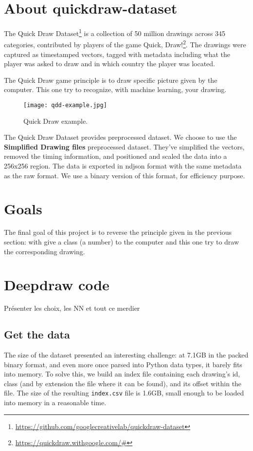 \documentclass[
  10pt, 
  a4paper,
  oneside, 
  headinclude, 
  footinclude, 
  BCOR5mm, 
]{scrartcl}
\begin{document}
\section{About quickdraw-dataset}

The Quick Draw Dataset\footnote{\url{https://github.com/googlecreativelab/quickdraw-dataset}} is a collection of 50 million drawings across 345 categories, contributed by players of the game Quick, Draw!\footnote{\url{https://quickdraw.withgoogle.com/\#}}. The drawings were captured as timestamped vectors, tagged with metadata including what the player was asked to draw and in which country the player was located.

The Quick Draw game principle is to draw specific picture given by the computer. This one try to recognize, with machine learning, your drawing.

\begin{figure}[h]
	\center
	\texttt{[image: qdd-example.jpg]}
	\caption{Quick Draw example.}
	\label{promo-asylamba}
\end{figure}

The Quick Draw Dataset provides preprocessed dataset. We choose to use the \textbf{Simplified Drawing files} preprocessed dataset. They've simplified the vectors, removed the timing information, and positioned and scaled the data into a 256x256 region. The data is exported in ndjson format with the same metadata as the raw format. We use a binary version of this format, for efficiency purpose.


\section{Goals}

The final goal of this project is to reverse the principle given in the previous section: with give a class (a number) to the computer and this one try to draw the corresponding drawing.


\section{Deepdraw code}

Présenter les choix, les NN et tout ce merdier

\subsection{Get the data}

The size of the dataset presented an interesting challenge: at 7.1GB in the
packed binary format, and even more once parsed into Python data types, it
barely fits into memory. To solve this, we build an index file containing each
drawing's id, class (and by extension the file where it can be found), and its
offset within the file. The size of the resulting \texttt{index.csv} file is
1.6GB, small enough to be loaded into memory in a reasonable time.
\end{document}
